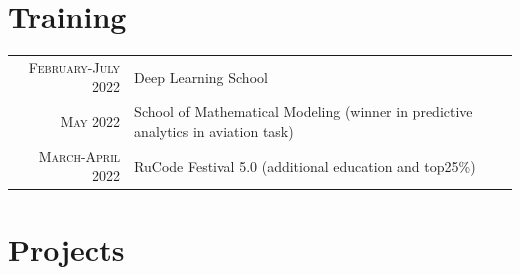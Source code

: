 \documentclass[a4paper,10pt]{article} %
\begin{document}
\section{Training}
\begin{tabular}{rp{9cm}}
    \textsc{February-July} 2022 & Deep Learning School\\

    \textsc{May} 2022 & School of Mathematical Modeling \footnotesize(winner in predictive analytics in aviation task)\normalsize\\

    \textsc{March-April} 2022 & RuCode Festival 5.0 \footnotesize(additional education and top25\%)\normalsize

    \end{tabular}

\section{Projects}
\end{document}
